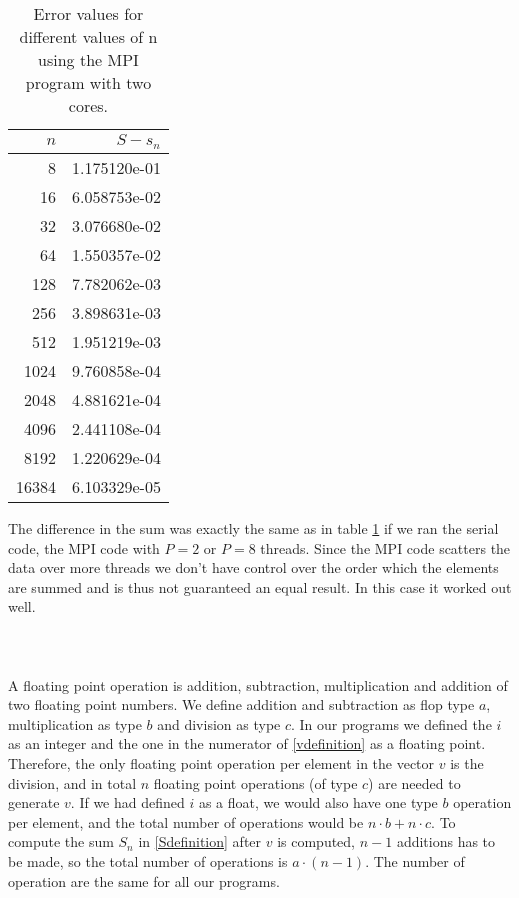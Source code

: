 \documentclass{article}
\begin{document}
\begin{table}
\centering
\caption{Error values for different values of n using the MPI program with two cores.}
\label{tab:MPIerror}
\begin{tabular}{rr}
$n$ & $S-s_n$  \\ 
\hline 
8     & 1.175120e-01 \\ 
16    & 6.058753e-02 \\ 
32    & 3.076680e-02 \\ 
64    & 1.550357e-02 \\ 
128   & 7.782062e-03 \\ 
256   & 3.898631e-03 \\ 
512   & 1.951219e-03 \\ 
1024  & 9.760858e-04 \\ 
2048  & 4.881621e-04 \\ 
4096  & 2.441108e-04 \\ 
8192  & 1.220629e-04 \\ 
16384 & 6.103329e-05
\end{tabular}
\end{table} 
The difference in the sum was exactly the same as in table \ref{tab:MPIerror} if we ran the serial code, the MPI code with $P =2$ or $P = 8$ threads. Since the MPI code scatters the data over more threads we don't have control over the order which the elements are summed and is thus not guaranteed an equal result. In this case it worked out well.\\\\
\\
\\
A floating point operation is addition, subtraction, multiplication and addition of two floating point numbers. We define addition and subtraction as flop type $a$, multiplication as type $b$ and division as type $c$. In our programs we defined the $i$ as an integer and the one in the numerator of \eqref{vdefinition} as a floating point. Therefore, the only floating point operation per element in the vector $v$ is the division, and in total $n$ floating point operations (of type $c$) are needed to generate $v$. If we had defined $i$ as a float, we would also have one type $b$ operation per element, and the total number of operations would be $n\cdot b + n\cdot c$. To compute the sum $S_n$ in \eqref{Sdefinition} after $v$ is computed, $n-1$ additions has to be made, so the total number of operations is $a\cdot (n-1)$. The number of operation are the same for all our programs.
\\
\\
\end{document}
